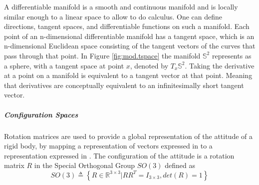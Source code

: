 A differentiable manifold is a smooth and continuous manifold and is locally similar enough to a linear space to allow to do calculus. One can define directions, tangent spaces, and differentiable functions on such a manifold. Each point of an n-dimensional differentiable manifold has a tangent space, which is an n-dimensional Euclidean space consisting of the tangent vectors of the curves that pass through that point. In Figure \ref{fig:mod.tspace} the manifold $ \mathbb{S}^2 $ represents as a sphere, with a tangent space at point $ x $, denoted by $ T_x\mathbb{S}^2 $. Taking the derivative at a point on a manifold is equivalent to a tangent vector at that point. Meaning that derivatives are conceptually equivalent to an infinitesimally short tangent vector. 
\begin{figure}[h!]
	\centering
	\caption{\label{fig:}}
\end{figure}		

\subparagraph{Configuration Spaces}
Rotation matrices are used to provide a global representation of the attitude of a rigid body, by mapping a representation of vectors expressed in \BF to a representation expressed in \IF \cite{Chaturvedi2011,Murray1994}. 
The configuration of the  attitude is a rotation matrix $ R $ in the Special Orthogonal Group $ SO(3) $ defined as
\begin{equation}\label{eq:SO3}
SO(3) \triangleq \left\lbrace R\in\mathbb{R}^{3\times3}|RR^T=I_{3\times3}, det(R)=1\right\rbrace 
\end{equation}


